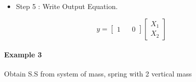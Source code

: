 \begin{itemize}
	\item Step 5 : Write Output Equation.
\end{itemize}
\[
y =
\begin{bmatrix}
	1 &   & 0 
\end{bmatrix}
\begin{bmatrix}
	X_1 \\
	X_2 
\end{bmatrix}
\]


\paragraph{Example 3} Obtain S.S from system of mass, spring with 2 vertical mass

\begin{figure}[ht]
	\centering
	
\end{figure}


